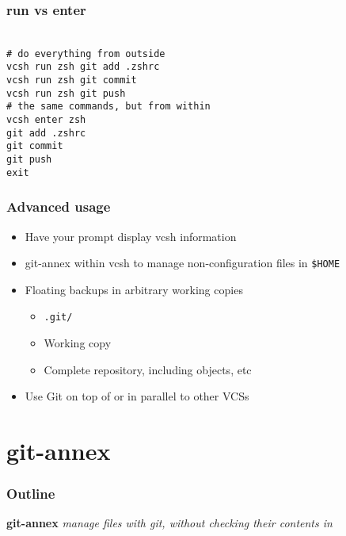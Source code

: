 \documentclass[t]{beamer}
\begin{document}
\begin{frame}
	\frametitle{run vs enter}
	\texttt{ \\
		\# do everything from outside \\
		vcsh run zsh git add .zshrc \\
		vcsh run zsh git commit \\
		vcsh run zsh git push \\
		\# the same commands, but from within\\
		vcsh enter zsh \\
		git add .zshrc \\
		git commit \\
		git push \\
		exit
	}
\end{frame}

\begin{frame}
	\frametitle{Advanced usage}
	\begin{itemize}
		\item Have your prompt display vcsh information
		\item git-annex within vcsh to manage non-configuration files in \texttt{\$HOME}
		\item Floating backups in arbitrary working copies
		\begin{itemize}
			\item \texttt{.git/}
			\item Working copy
			\item Complete repository, including objects, etc
		\end{itemize}
		\item Use Git on top of or in parallel to other VCSs
	\end{itemize}
\end{frame}


\section{git-annex}

\begin{frame}
	\frametitle{Outline}
	\tableofcontents[currentsection]
\end{frame}

\begin{frame}
		\begin{center}
			\vfill
			\vfill
			\textbf{git-annex}
			\vfill
			\textit{manage files with git, without checking their contents in}
			\vfill
			\vfill
		\end{center}
\end{frame}
\end{document}
